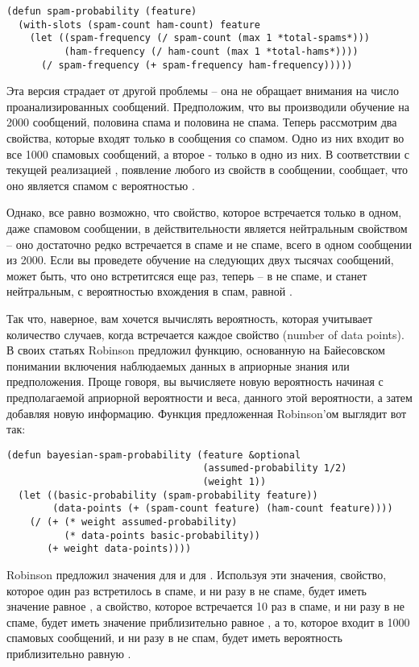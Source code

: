 \begin{lstlisting}
(defun spam-probability (feature)
  (with-slots (spam-count ham-count) feature
    (let ((spam-frequency (/ spam-count (max 1 *total-spams*)))
          (ham-frequency (/ ham-count (max 1 *total-hams*))))
      (/ spam-frequency (+ spam-frequency ham-frequency)))))
\end{lstlisting}

Эта версия страдает от другой проблемы -- она не обращает внимания на число
проанализированных сообщений.  Предположим, что вы производили обучение на 2000 сообщений,
половина спама и половина не спама.  Теперь рассмотрим два свойства, которые входят только
в сообщения со спамом.  Одно из них входит во все 1000 спамовых сообщений, а второе -
только в одно из них.  В соответствии с текущей реализацией ,
появление любого из свойств в сообщении, сообщает, что оно является спамом с вероятностью
.

Однако, все равно возможно, что свойство, которое встречается только в одном, даже
спамовом сообщении, в действительности является нейтральным свойством -- оно достаточно
редко встречается в спаме и не спаме, всего в одном сообщении из 2000.  Если вы проведете
обучение на следующих двух тысячах сообщений, может быть, что оно встретитсяся еще раз,
теперь -- в не спаме, и станет нейтральным, с вероятностью вхождения в спам, равной
.

Так что, наверное, вам хочется вычислять вероятность, которая учитывает количество
случаев, когда встречается каждое свойство (number of data points).  В своих статьях
Robinson предложил функцию, основанную на Байесовском понимании включения наблюдаемых
данных в априорные знания или предположения. Проще говоря, вы вычисляете новую вероятность
начиная с предполагаемой априорной вероятности и веса, данного этой вероятности, а затем
добавляя новую информацию. Функция предложенная Robinson'ом выглядит вот так:

\begin{lstlisting}
(defun bayesian-spam-probability (feature &optional
                                  (assumed-probability 1/2)
                                  (weight 1))
  (let ((basic-probability (spam-probability feature))
        (data-points (+ (spam-count feature) (ham-count feature))))
    (/ (+ (* weight assumed-probability)
          (* data-points basic-probability))
       (+ weight data-points))))
\end{lstlisting}

Robinson предложил значения  для  и  для
.  Используя эти значения, свойство, которое один раз встретилось в спаме, и
ни разу в не спаме, будет иметь значение  равное
, а свойство, которое встречается 10 раз в спаме, и ни разу в не спаме, будет
иметь значение  приблизительно равное , а то,
которое входит в 1000 спамовых сообщений, и ни разу в не спам, будет иметь вероятность
приблизительно равную .

